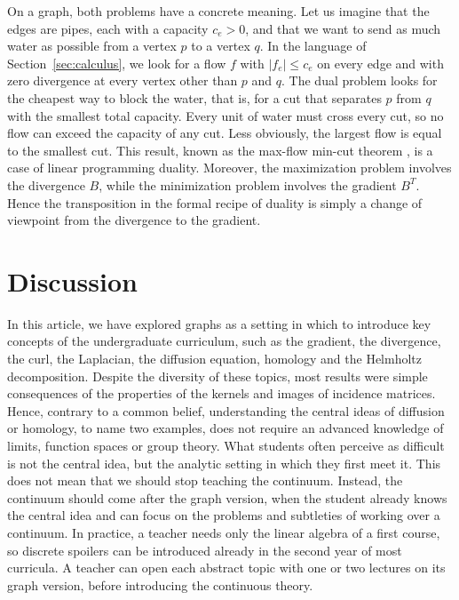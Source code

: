 \documentclass[11pt,a4paper]{article}
\theoremstyle{plain}
\theoremstyle{definition}
\begin{document}
On a graph, both problems have a concrete meaning. Let us imagine that the edges are pipes, each with a capacity $c_e>0$, and that we want to send as much water as possible from a vertex $p$ to a vertex $q$. In the language of Section~\ref{sec:calculus}, we look for a flow $f$ with $|f_e|\le c_e$ on every edge and with zero divergence at every vertex other than $p$ and $q$. The dual problem looks for the cheapest way to block the water, that is, for a cut that separates $p$ from $q$ with the smallest total capacity. Every unit of water must cross every cut, so no flow can exceed the capacity of any cut. Less obviously, the largest flow is equal to the smallest cut. This result, known as the max-flow min-cut theorem  \cite{ford1956}, is a case of linear programming duality. Moreover, the maximization problem involves the divergence $B$, while the minimization problem involves the gradient $B^T$. Hence the transposition in the formal recipe of duality is simply a change of viewpoint from the divergence to the gradient.

\section{Discussion}\label{sec:discussion}

In this article, we have explored graphs as a setting in which to introduce key concepts of the undergraduate curriculum, such as the gradient, the divergence, the curl, the Laplacian, the diffusion equation, homology and the Helmholtz decomposition. Despite the diversity of these topics, most results were simple consequences of the properties of the kernels and images of incidence matrices. Hence, contrary to a common belief, understanding the central ideas of diffusion or homology, to name two examples, does not require an advanced knowledge of limits, function spaces or group theory. What students often perceive as difficult is not the central idea, but the analytic setting in which they first meet it. This does not mean that we should stop teaching the continuum. Instead, the continuum should come after the graph version, when the student already knows the central idea and can focus on the problems and subtleties of working over a continuum. In practice, a teacher needs only the linear algebra of a first course, so discrete spoilers can be introduced already in the second year of most curricula. A teacher can open each abstract topic with one or two lectures on its graph version, before introducing the continuous theory.
\end{document}
